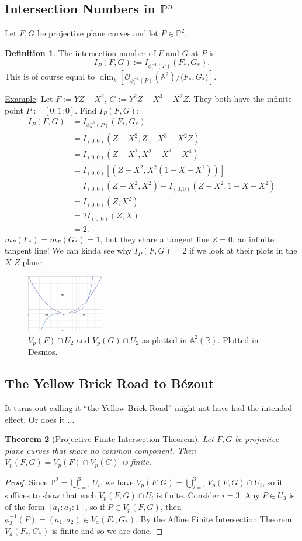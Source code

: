 \documentclass[12pt]{article}
\newcommand{\real}{\mathbb{R}}
\newcommand{\vbrack}[1]{\langle #1\rangle}
\newtheorem{theorem}{Theorem}[section]
\theoremstyle{definition}
\newtheorem{definition}[theorem]{Definition}
\begin{document}
\subsection{Intersection Numbers in $\mathbb{P}^n$}
Let $F,G$ be projective plane curves and let $P\in\mathbb{P}^2$.
\begin{definition}
    The intersection number of $F$ and $G$ at $P$ is
    \begin{equation}
        \boxed{I_P(F,G):=I_{\phi_i^{-1}(P)}(F_*,G_*).}
    \end{equation}
    This is of course equal to $\dim_k\left[\mathcal{O}_{\phi_i^{-1}(P)}(\mathbb{A}^2)/\vbrack{F_*,G_*}\right]$.
\end{definition}
\underline{Example}: Let $F:=YZ-X^2$, $G:=Y^2Z-X^3-X^2Z$. They both have the infinite point $P:=[0:1:0]$. Find $I_P(F,G)$:
\begin{align*}
    I_P(F,G)&=I_{\phi_2^{-1}(P)}(F_*,G_*)\\
    &=I_{(0,0)}(Z-X^2,Z-X^3-X^2Z)\\
    &=I_{(0,0)}(Z-X^2,X^2-X^3-X^4)\\
    &=I_{(0,0)}[(Z-X^2,X^2(1-X-X^2))]\\
    &=I_{(0,0)}(Z-X^2,X^2)+I_{(0,0)}(Z-X^2,1-X-X^2)\\
    &=I_{(0,0)}(Z,X^2)\\
    &=2I_{(0,0)}(Z,X)\\
    &=\boxed{2.}
\end{align*}
$m_P(F_*)=m_P(G_*)=1$, but they share a tangent line $Z=0$, an infinite tangent line! We can kinda see why $I_P(F,G)=2$ if we look at their plots in the $X$-$Z$ plane:
\begin{figure}[H]
    \centering
    \includegraphics[width=0.3\textwidth]{34.png}
    \caption{$V_p(F)\cap U_2$ and $V_p(G)\cap U_2$ as plotted in $\mathbb{A}^2(\real)$. Plotted in Desmos.}
\end{figure}
\subsection{The Yellow Brick Road to B\'ezout}
It turns out calling it ``the Yellow Brick Road'' might not have had the intended effect. Or does it $\dotsc$
\begin{theorem}[Projective Finite Intersection Theorem]
    Let $F,G$ be projective plane curves that share no common component. Then $V_p(F,G)=V_p(F)\cap V_p(G)$ is finite.
\end{theorem}
\begin{proof}
    Since $\mathbb{P}^2=\bigcup\limits_{i=1}^3U_i$, we have $V_p(F,G)=\bigcup\limits_{i=1}^3V_p(F,G)\cap U_i$, so it suffices to show that each $V_p(F,G)\cap U_i$ is finite. Consider $i=3$. Any $P\in U_3$ is of the form $[a_1:a_2:1]$, so if $P\in V_p(F,G)$, then $\phi_3^{-1}(P)=(a_1,a_2)\in V_a(F_*,G_*)$. By the Affine Finite Intersection Theorem, $V_a(F_*,G_*)$ is finite and so we are done.
\end{proof}
\end{document}
